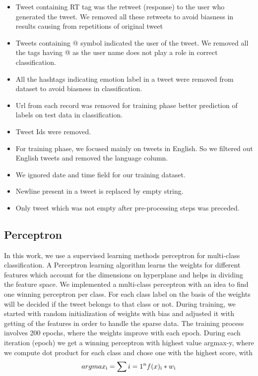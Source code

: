 \documentclass[11pt]{article}
\begin{document}
  \begin{itemize}
  \item Tweet containing RT tag was the retweet (response) to the user who generated the tweet. We removed all these retweets to avoid biasness in results causing from repetitions of original tweet
  \item Tweets containing @ symbol indicated the user of the tweet. We removed all the tags having @ as the user name does not play a role in correct classification.
  \item All the hashtags indicating emotion label in a tweet were removed from dataset to avoid biasness in classification.
  \item Url from each record was removed for training phase better prediction of labels on test data in classification.
  \item Tweet Ids were removed.
  \item For training phase, we focused mainly on tweets in English. So we filtered out English tweets and removed the language column.
  \item We ignored date and time field for our training dataset.
  \item   Newline present in a tweet is replaced by empty string.
  \item   Only tweet which was not empty after pre-processing steps was preceded.
  \end{itemize}
  
  
  \subsection{Perceptron}
  
  In this work, we use a supervised learning methods perceptron for multi-class classification. A Perceptron learning algorithm learns the weights for different features which account for the dimensions on hyperplane and helps in dividing the feature space. We implemented a multi-class perceptron with an idea to find one winning perceptron per class.
    For each class label on the basis of the weights will be decided if the tweet belongs to that class or not. During training, we started with random initialization of weights with bias and adjusted it with getting of the features in order to handle the sparse data. The training process involves 200 epochs, where the weights improve with each epoch. During each iteration (epoch) we get a winning perceptron with highest value argmax-y, where we compute dot product for each class and chose one with the highest score, with
    {$$arg max\textsubscript{i} = \sum\limits {i=1}^n f(x)\textsubscript{i} * w\textsubscript{i}$$}
  
\end{document}
